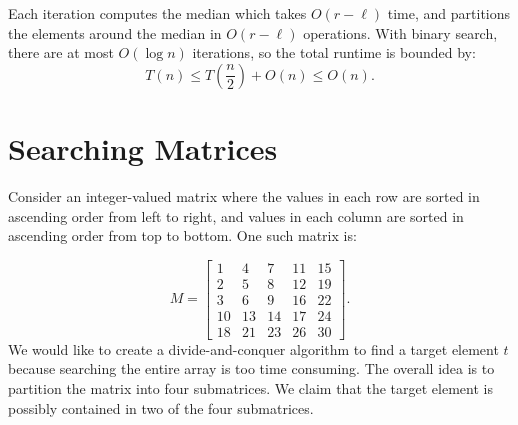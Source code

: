 \documentclass[11pt]{article}
\begin{document}
Each iteration computes the median which takes $O(r - \ell)$ time, and partitions the elements around the median in $O(r - \ell)$ operations. With binary search, there are at most $O(\log n)$ iterations, so the total runtime is bounded by:
\begin{equation}
    T(n) \leq T\left(\frac{n}{2}\right) + O(n) \leq O(n). 
\end{equation}



\section{Searching Matrices}
Consider an integer-valued matrix where the values in each row are sorted in ascending order from left to right, and values in each column are sorted in ascending order from top to bottom. One such matrix is:

\scriptsize 
\begin{equation*}
    M = \begin{bmatrix}
        1 & 4 & 7 & 11 & 15 \\
        2 & 5 & 8 & 12 & 19 \\
        3 & 6 & 9 & 16 & 22 \\
        10 & 13 & 14 & 17 & 24 \\
        18 & 21 & 23 & 26 & 30
    \end{bmatrix}.
\end{equation*}
\normalsize
We would like to create a divide-and-conquer algorithm to find a target element $t$ because searching the entire array is too time consuming. The overall idea is to partition the matrix into four submatrices. We claim that the target element is possibly contained in two of the four submatrices.
\end{document}

